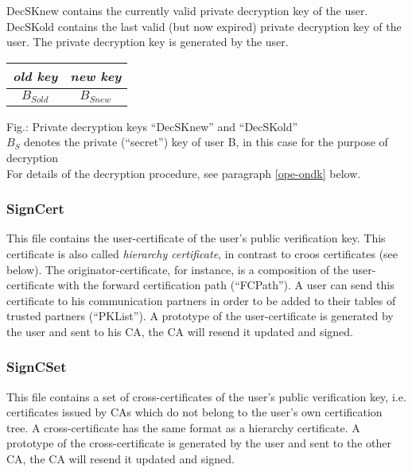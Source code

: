 DecSKnew
contains the currently valid private decryption key of the user.
DecSKold
contains the last valid (but now expired) private decryption key of the user.
The private decryption key is generated by the user.

\begin {center}
\begin {tabular}{|c|c|}
\hline
{\em old key} & {\em new key} \\ \hline
$B_{Sold}$    & $B_{Snew}$    \\ \hline
\end {tabular}
\end {center}
 
\label{fig-decsk}
{\footnotesize Fig.: Private decryption keys ``DecSKnew'' and ``DecSKold''}
\\
{\footnotesize $B_S$ denotes the private (``secret'') key
of user B, in this case for the purpose of decryption}
\\ [1em]
For details of the decryption procedure,
see paragraph \ref{ope-ondk} below.

\subsubsection{SignCert}
\label{signcert}

This file contains the user-certificate of the
user's public verification key. This certificate is also
called {\em hierarchy certificate}, in contrast to croos
certificates (see below).
The originator-certificate, for instance, is a composition of the
user-certificate with the
forward certification path (``FCPath'').
A user can send this certificate to his communication
partners in order to be added to their tables of trusted
partners (``PKList'').
A prototype of the
user-certificate is generated by the user
and sent to his CA, the CA will resend it updated and signed.

\subsubsection{SignCSet}
\label{signcset}

This file contains a set of cross-certificates of the
user's public verification key, i.e. certificates issued
by CAs which do not belong to the user's own certification tree.
A cross-certificate has the same format as a hierarchy certificate.
A prototype of the
cross-certificate is generated by the user
and sent to the other CA, the CA will resend it updated and signed.


